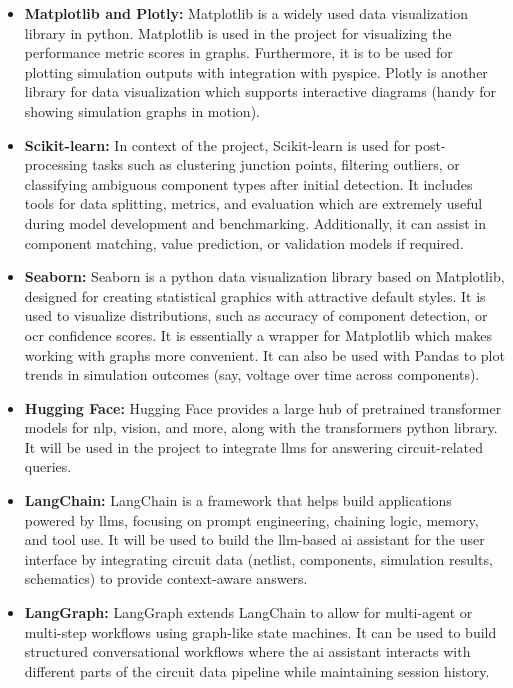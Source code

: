 \begin{itemize}
    \item \textbf{Matplotlib and Plotly:} Matplotlib is a widely used data visualization library in \gls{python}. Matplotlib is used in the project for visualizing the performance metric scores in graphs. Furthermore, it is to be used for plotting simulation outputs with integration with \gls{pyspice}. Plotly is another library for data visualization which supports interactive diagrams (handy for showing simulation graphs in motion).
    
    \item \textbf{Scikit-learn:} In context of the project, Scikit-learn is used for post-processing tasks such as clustering junction points, filtering outliers, or classifying ambiguous component types after initial detection. It includes tools for data splitting, metrics, and evaluation which are extremely useful during model development and benchmarking. Additionally, it can assist in component matching, value prediction, or validation models if required.
    
    \item \textbf{Seaborn:} Seaborn is a \gls{python} data visualization library based on Matplotlib, designed for creating statistical graphics with attractive default styles. It is used to visualize distributions, such as accuracy of component detection, or \gls{ocr} confidence scores. It is essentially a wrapper for Matplotlib which makes working with graphs more convenient. It can also be used with Pandas to plot trends in simulation outcomes (say, voltage over time across components).
    
    \item \textbf{Hugging Face:} Hugging Face provides a large hub of pretrained transformer models for \gls{nlp}, vision, and more, along with the transformers \gls{python} library. It will be used in the project to integrate \glspl{llm} for answering circuit-related queries.
    
    \item \textbf{LangChain:} LangChain is a framework that helps build applications powered by \glspl{llm}, focusing on prompt engineering, chaining logic, memory, and tool use. It will be used to build the \gls{llm}-based \gls{ai} assistant for the user interface by integrating circuit data (netlist, components, simulation results, schematics) to provide context-aware answers.
    
    \item \textbf{LangGraph:} LangGraph extends LangChain to allow for multi-agent or multi-step workflows using graph-like state machines. It can be used to build structured conversational workflows where the \gls{ai} assistant interacts with different parts of the circuit data pipeline while maintaining session history.
\end{itemize}

